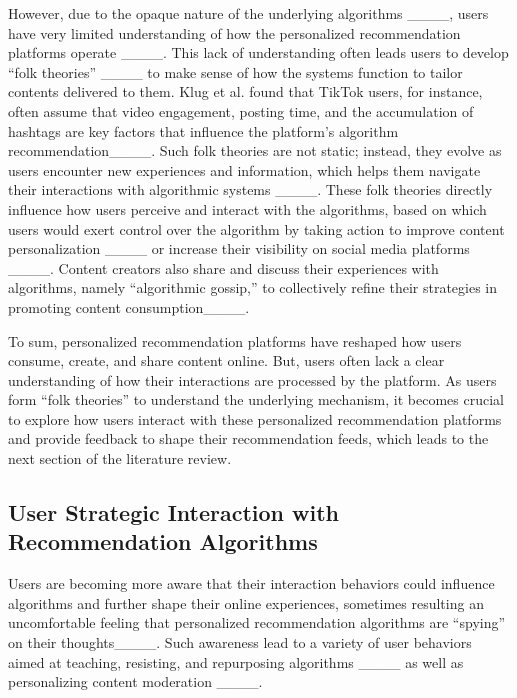 However, due to the opaque nature of the underlying algorithms ____, users have very limited understanding of how the personalized recommendation platforms operate ____. This lack of understanding often leads users to develop ``folk theories'' ____ to make sense of how the systems function to tailor contents delivered to them. Klug et al. found that TikTok users, for instance, often assume that video engagement, posting time, and the accumulation of hashtags are key factors that influence the platform's algorithm recommendation____. Such folk theories are not static; instead, they evolve as users encounter new experiences and information, which helps them navigate their interactions with algorithmic systems ____. These folk theories directly influence how users perceive and interact with the algorithms, based on which users would exert control over the algorithm by taking action to improve content personalization ____ or increase their visibility on social media platforms ____. Content creators also share and discuss their experiences with algorithms, namely ``algorithmic gossip,'' to collectively refine their strategies in promoting content consumption____. 

To sum, personalized recommendation platforms have reshaped how users consume, create, and share content online. But, users often lack a clear understanding of how their interactions are processed by the platform. As users form ``folk theories'' to understand the underlying mechanism, it becomes crucial to explore how users interact with these personalized recommendation platforms and provide feedback to shape their recommendation feeds, which leads to the next section of the literature review.


\subsection{User Strategic Interaction with Recommendation Algorithms}
Users are becoming more aware that their interaction behaviors could influence algorithms and further shape their online experiences, sometimes resulting an uncomfortable feeling that personalized recommendation algorithms are ``spying'' on their thoughts____. Such awareness lead to a variety of user behaviors aimed at teaching, resisting, and repurposing algorithms ____ as well as personalizing content moderation ____. 

